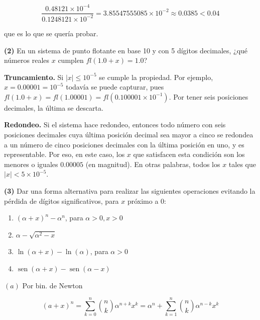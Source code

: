 \documentclass[12pt]{article}
\begin{document}
\begin{equation*}
    \frac{0.48121 \times 10^{-4}}{0.1248121 \times 10^{-2}} = 3.85547555085
    \times 10^{-2} \approx 0.0385 < 0.04
\end{equation*}

que es lo que se quería probar.


\pagebreak 

\begin{myframe}
    \textbf{(2)} En un sistema de punto flotante en base 10 y con 5 dígitos decimales, ¿qué números reales $x$ cumplen $fl(1.0 + x) = 1.0$?
\end{myframe}

\textbf{Truncamiento.} Si $|x| \leq 10^{-5}$ se cumple la propiedad. Por
ejemplo, $x = 0.00001 = 10^{-5}$ todavía se puede capturar, pues $fl(1.0 + x) =
fl(1.00001) = fl(0.100001 \times 10^{-1})$. Por tener seis posiciones decimales,
la última se descarta.

\textbf{Redondeo.} Si el sistema hace redondeo, entonces todo número con seis
posiciones decimales cuya última posición decimal sea mayor a cinco se redondea
a un número de cinco posiciones decimales con la última posición en uno, y es
representable. Por eso, en este caso, los $x$ que satisfacen esta condición son
los menores o iguales $0.00005$ (en magnitud). En otras palabras, todos los $x$ tales que
$\left| x \right| < 5 \times 10^{-5}$.


\pagebreak 

\begin{myframe}
    \textbf{(3)} Dar una forma alternativa para realizar las siguientes operaciones evitando la pérdida de dígitos significativos, para $x$ próximo a 0:
    
    \begin{enumerate}
        \item $(\alpha + x)^n - \alpha^n$, para $\alpha > 0, x > 0$
        \item $\alpha - \sqrt{\alpha^2 - x}$
        \item $\ln(\alpha + x) - \ln(\alpha)$, para $\alpha > 0$
        \item $\operatorname{sen}(\alpha + x) - \operatorname{sen}(\alpha - x)$
    \end{enumerate}
\end{myframe}

$(a)$ Por bin. de Newton

$$(a+x)^n = \sum_{k=0}^n \binom{n}{k} \alpha^{n+k} x^k = \alpha^n +
\sum_{k=1}^{n} \binom{n}{k}\alpha^{n-k} x^k$$
\end{document}
